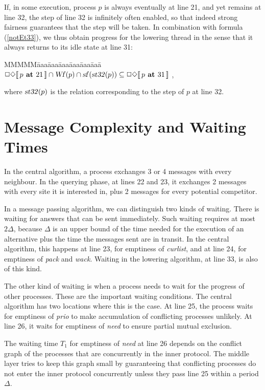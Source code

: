 \documentclass[10pt]{article} \usepackage[english]{babel}
\newenvironment{tab}{\begin{tabbing}
MMMMM\=aaa\=aaa\=aaa\=aaa\=aaa\=aaa\= \kill}{\end{tabbing}}
\def\sem #1{\hbox{$[\![\, #1\, ]\!] $}}
\def\S #1/{\mbox {\textsl{#1}}}
\def\B #1/{\mbox {\textbf{#1}}}
\begin{document}
If, in some execution, process $p$ is always eventually at line 21,
and yet remains at line 32, the step of line 32 is infinitely often
enabled, so that indeed strong fairness guarantees that the step will
be taken.  In combination with formula (\ref{notEt33}), we thus obtain
progress for the lowering thread in the sense that it always returns
to its idle state at line 31:
\begin{tab}
\> $ \Box\Diamond\sem{p\B\ at /21} \cap \S Wf/(p)\cap\S sf/(\S st32/(p))
\subseteq \Box\Diamond\sem{p\B\ at /31} $ ,
\end{tab}
where $\S st32/(p)$ is the relation corresponding to the step of $p$
at line 32.



\section {Message Complexity and Waiting Times} 
\label{summ_alg}

In the central algorithm, a process exchanges 3 or 4 messages with
every neighbour.  In the querying phase, at lines 22 and 23, it
exchanges 2 messages with every site it is interested in, plus 2
messages for every potential competitor.

In a message passing algorithm, we can distinguish two kinds of
waiting.  There is waiting for answers that can be sent immediately.
Such waiting requires at most $2\Delta$, because $\Delta$ is an upper
bound of the time needed for the execution of an alternative plus the
time the messages sent are in transit.  In the central algorithm, this
happens at line 23, for emptiness of \S curlist/, and at line 24, for
emptiness of \S pack/ and \S wack/.  Waiting in the lowering
algorithm, at line 33, is also of this kind.

The other kind of waiting is when a process needs to wait for the
progress of other processes.  These are the important waiting
conditions.  The central algorithm has two locations where this is the
case.  At line 25, the process waits for emptiness of \S prio/ to make
accumulation of conflicting processes unlikely.  At line 26, it waits
for emptiness of \S need/ to ensure partial mutual exclusion.

The waiting time $T_1$ for emptiness of \S need/ at line 26 depends on
the conflict graph of the processes that are concurrently in the inner
protocol. The middle layer tries to keep this graph small by
guaranteeing that conflicting processes do not enter the inner
protocol concurrently unless they pass line 25 within a period
$\Delta$.
\end{document}
